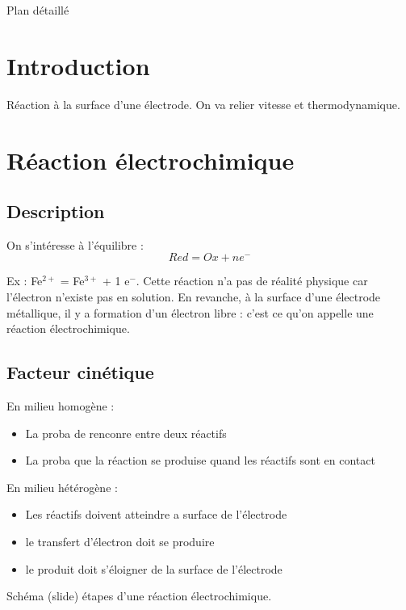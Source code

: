 \begin{reportBlock}{Plan détaillé}
\section*{Introduction }
Réaction à la surface d'une électrode. On va relier vitesse et thermodynamique.

\section{Réaction électrochimique}

\subsection{Description}
On s'intéresse à l'équilibre :
\begin{equation}
    Red = Ox + ne^-
\end{equation}

Ex : Fe$^{2+}$ = Fe$^{3+}$ + 1 e$^-$. Cette réaction n'a pas de réalité physique car l'électron n'existe pas en solution. En revanche, à la surface d'une électrode métallique, il y a formation d'un électron libre : c'est ce qu'on appelle une réaction électrochimique.

\subsection{Facteur cinétique}
En milieu homogène : 
\begin{itemize}
    \item La proba de renconre entre deux réactifs
    \item La proba que la réaction se produise quand les réactifs sont en contact
\end{itemize}
En milieu hétérogène :
\begin{itemize}
    \item Les réactifs doivent atteindre a surface de l'électrode
    \item le transfert d'électron doit se produire
    \item le produit doit s'éloigner de la surface de l'électrode
\end{itemize}
Schéma (slide) étapes d'une réaction électrochimique.


\end{reportBlock}
